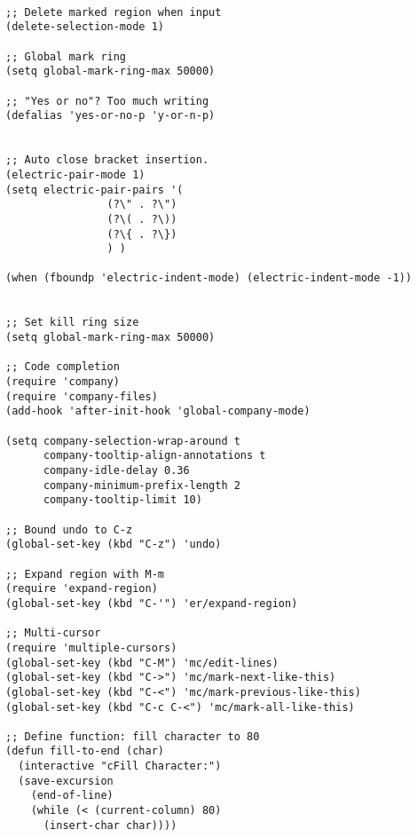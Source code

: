 \documentclass[11pt]{article}
\begin{document}
\begin{verbatim}

;; Delete marked region when input
(delete-selection-mode 1)

;; Global mark ring
(setq global-mark-ring-max 50000)

;; "Yes or no"? Too much writing
(defalias 'yes-or-no-p 'y-or-n-p)


;; Auto close bracket insertion.
(electric-pair-mode 1)
(setq electric-pair-pairs '(
			    (?\" . ?\")
			    (?\( . ?\))
			    (?\{ . ?\})
			    ) )

(when (fboundp 'electric-indent-mode) (electric-indent-mode -1))


;; Set kill ring size
(setq global-mark-ring-max 50000)

;; Code completion
(require 'company)
(require 'company-files)
(add-hook 'after-init-hook 'global-company-mode)

(setq company-selection-wrap-around t
      company-tooltip-align-annotations t
      company-idle-delay 0.36
      company-minimum-prefix-length 2
      company-tooltip-limit 10)

;; Bound undo to C-z
(global-set-key (kbd "C-z") 'undo)

;; Expand region with M-m
(require 'expand-region)
(global-set-key (kbd "C-'") 'er/expand-region)

;; Multi-cursor
(require 'multiple-cursors)
(global-set-key (kbd "C-M") 'mc/edit-lines)
(global-set-key (kbd "C->") 'mc/mark-next-like-this)
(global-set-key (kbd "C-<") 'mc/mark-previous-like-this)
(global-set-key (kbd "C-c C-<") 'mc/mark-all-like-this)

;; Define function: fill character to 80
(defun fill-to-end (char)
  (interactive "cFill Character:")
  (save-excursion
    (end-of-line)
    (while (< (current-column) 80)
      (insert-char char))))

\end{verbatim}
\end{document}
